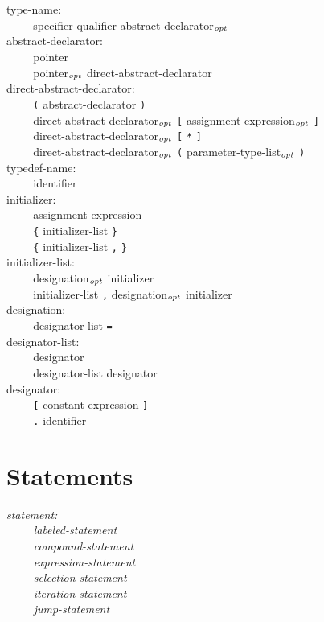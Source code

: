 \documentclass[12pt]{report}
\def\|{\verb|}
\newcommand\opt{$_{{\it opt}}$ }
\begin{document}
\noindent
type-name:\\
\|    | specifier-qualifier abstract-declarator\opt\\

\noindent
abstract-declarator:\\
\|    | pointer\\
\|    | pointer\opt direct-abstract-declarator\\

\noindent
direct-abstract-declarator:\\
\|    | \verb+(+ abstract-declarator \verb+)+\\
\|    | direct-abstract-declarator\opt \verb+[+ assignment-expression\opt \verb+]+\\
\|    | direct-abstract-declarator\opt \verb+[+ \verb+*+ \verb+]+\\
\|    | direct-abstract-declarator\opt \verb+(+ parameter-type-list\opt \verb+)+\\

\noindent
typedef-name:\\
\|    | identifier\\

\noindent
initializer:\\
\|    | assignment-expression\\
\|    | \verb+{+ initializer-list \verb+}+\\
\|    | \verb+{+ initializer-list \verb+,+ \verb+}+\\

\noindent
initializer-list:\\
\|    | designation\opt initializer\\
\|    | initializer-list \verb+,+ designation\opt initializer\\

\noindent
designation:\\
\|    | designator-list \verb+=+\\

\noindent
designator-list:\\
\|    | designator\\
\|    | designator-list designator\\

\noindent
designator:\\
\|    | \verb+[+ constant-expression \verb+]+\\
\|    | \verb+.+ identifier\\

\rm
\section{Statements}
\it
\noindent
statement:\\
\|    | labeled-statement\\
\|    | compound-statement\\
\|    | expression-statement\\
\|    | selection-statement\\
\|    | iteration-statement\\
\|    | jump-statement\\
\end{document}
